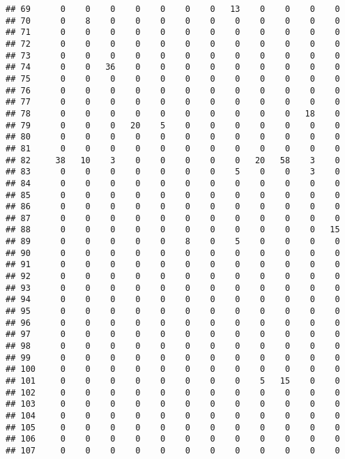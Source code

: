 \documentclass[]{article}
\begin{document}
\begin{verbatim}
## 69      0    0    0    0    0    0    0   13    0    0    0    0
## 70      0    8    0    0    0    0    0    0    0    0    0    0
## 71      0    0    0    0    0    0    0    0    0    0    0    0
## 72      0    0    0    0    0    0    0    0    0    0    0    0
## 73      0    0    0    0    0    0    0    0    0    0    0    0
## 74      0    0   36    0    0    0    0    0    0    0    0    0
## 75      0    0    0    0    0    0    0    0    0    0    0    0
## 76      0    0    0    0    0    0    0    0    0    0    0    0
## 77      0    0    0    0    0    0    0    0    0    0    0    0
## 78      0    0    0    0    0    0    0    0    0    0   18    0
## 79      0    0    0   20    5    0    0    0    0    0    0    0
## 80      0    0    0    0    0    0    0    0    0    0    0    0
## 81      0    0    0    0    0    0    0    0    0    0    0    0
## 82     38   10    3    0    0    0    0    0   20   58    3    0
## 83      0    0    0    0    0    0    0    5    0    0    3    0
## 84      0    0    0    0    0    0    0    0    0    0    0    0
## 85      0    0    0    0    0    0    0    0    0    0    0    0
## 86      0    0    0    0    0    0    0    0    0    0    0    0
## 87      0    0    0    0    0    0    0    0    0    0    0    0
## 88      0    0    0    0    0    0    0    0    0    0    0   15
## 89      0    0    0    0    0    8    0    5    0    0    0    0
## 90      0    0    0    0    0    0    0    0    0    0    0    0
## 91      0    0    0    0    0    0    0    0    0    0    0    0
## 92      0    0    0    0    0    0    0    0    0    0    0    0
## 93      0    0    0    0    0    0    0    0    0    0    0    0
## 94      0    0    0    0    0    0    0    0    0    0    0    0
## 95      0    0    0    0    0    0    0    0    0    0    0    0
## 96      0    0    0    0    0    0    0    0    0    0    0    0
## 97      0    0    0    0    0    0    0    0    0    0    0    0
## 98      0    0    0    0    0    0    0    0    0    0    0    0
## 99      0    0    0    0    0    0    0    0    0    0    0    0
## 100     0    0    0    0    0    0    0    0    0    0    0    0
## 101     0    0    0    0    0    0    0    0    5   15    0    0
## 102     0    0    0    0    0    0    0    0    0    0    0    0
## 103     0    0    0    0    0    0    0    0    0    0    0    0
## 104     0    0    0    0    0    0    0    0    0    0    0    0
## 105     0    0    0    0    0    0    0    0    0    0    0    0
## 106     0    0    0    0    0    0    0    0    0    0    0    0
## 107     0    0    0    0    0    0    0    0    0    0    0    0

\end{verbatim}
\end{document}
